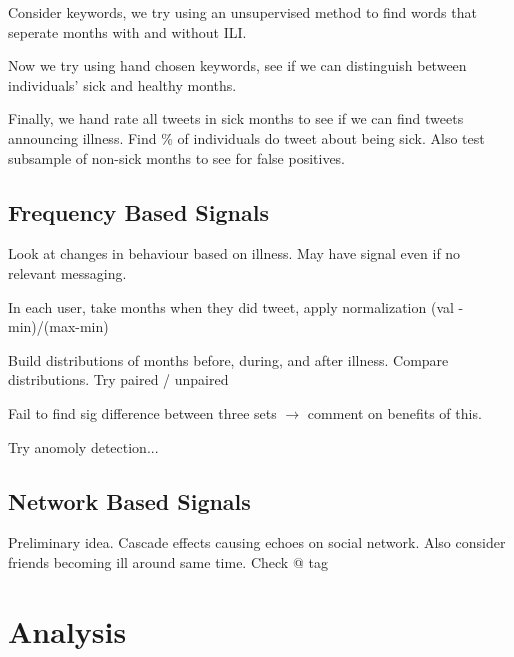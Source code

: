 \documentclass{acm_proc_article-sp}
\begin{document}
Consider keywords, we try using an unsupervised method to find words that seperate months with and without ILI.

Now we try using hand chosen keywords, see if we can distinguish between individuals' sick and healthy months.

Finally, we hand rate all tweets in sick months to see if we can find tweets announcing illness. Find \% of individuals do tweet about being sick. Also test subsample of non-sick months to see for false positives.

\subsection{Frequency Based Signals}

Look at changes in behaviour based on illness. May have signal even if no  relevant messaging.

In each user, take months when they did tweet, apply normalization (val - min)/(max-min)

Build distributions of months before, during, and after illness. Compare distributions. Try paired / unpaired

Fail to find sig difference between three sets \(\to\) comment on benefits of this.

Try anomoly detection...







\subsection{Network Based Signals}

Preliminary idea. Cascade effects causing echoes on social network. Also consider friends becoming ill around same time. Check @ tag

\section{Analysis}
\end{document}
